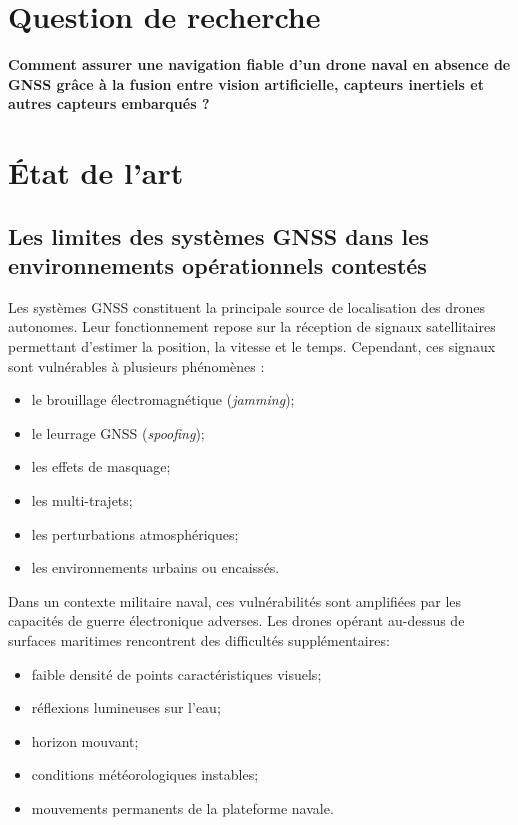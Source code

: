 \documentclass[12pt, a4paper, twoside, openright]{report}
\begin{document}
\section{Question de recherche}
\begin{framed}
    \textbf{Comment assurer une navigation fiable d’un drone naval en absence de GNSS grâce à la fusion entre vision artificielle, capteurs inertiels et autres capteurs embarqués ?}
\end{framed}

\section{État de l’art}

\subsection{Les limites des systèmes GNSS dans les environnements opérationnels contestés}
Les systèmes GNSS constituent la principale source de localisation des drones autonomes. Leur fonctionnement repose sur la réception de signaux satellitaires permettant d’estimer la position, la vitesse et le temps. Cependant, ces signaux sont vulnérables à plusieurs phénomènes \cite{mostafa2016gnss, mostafa2022gnss}:
\begin{itemize}
    \item le brouillage électromagnétique (\textit{jamming});
        \item le leurrage GNSS (\textit{spoofing});
    \item les effets de masquage;
    \item les multi-trajets;
    \item les perturbations atmosphériques;
    \item les environnements urbains ou encaissés.
\end{itemize}

Dans un contexte militaire naval, ces vulnérabilités sont amplifiées par les capacités de guerre électronique adverses. Les drones opérant au-dessus de surfaces maritimes rencontrent des difficultés supplémentaires:
\begin{itemize}
    \item faible densité de points caractéristiques visuels;
    \item réflexions lumineuses sur l’eau;
    \item horizon mouvant;
    \item conditions météorologiques instables;
    \item mouvements permanents de la plateforme navale.
\end{itemize}
\end{document}
